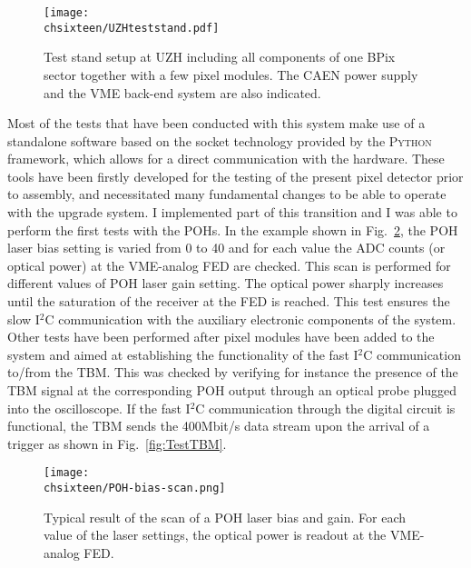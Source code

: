 \begin{figure}[!htb]
 \begin{center}
 \texttt{[image: \\chsixteen/UZHteststand.pdf]}
 \end{center}
 \caption{Test stand setup at UZH including all components of one BPix sector together with a few pixel modules. The CAEN power supply and the VME back-end system are also indicated.}
 \label{fig:TestStandUZH}
\end{figure} 

Most of the tests that have been conducted with this system make use of a standalone software based on the socket technology provided by the \textsc{Python} framework,
which allows for a direct communication with the hardware. 
These tools have been firstly developed for the testing of the present pixel detector prior to assembly\cite{Caminada:2010gsa}, and necessitated many fundamental changes to be able to operate with the upgrade system.
I implemented part of this transition and I was able to perform the first tests with the POHs.
In the example shown in Fig.~\ref{fig:TestPOH}, the POH laser bias setting is varied from 0 to 40 and for each value the ADC counts (or optical power) at the VME-analog FED are checked.
This scan is performed for different values of POH laser gain setting.
The optical power sharply increases until the saturation of the receiver at the FED is reached.
This test ensures the slow I$^2$C communication with the auxiliary electronic components of the system.
Other tests have been performed after pixel modules have been added to the system and aimed at establishing the functionality of the fast I$^2$C communication to/from the TBM.
This was checked by verifying for instance the presence of the TBM signal at the corresponding POH output through an optical probe plugged into the oscilloscope.
If the fast I$^2$C communication through the digital circuit is functional, the TBM sends the 400\unit{Mbit/s} data stream upon the arrival of a trigger as shown in Fig.~\ref{fig:TestTBM}.

\begin{figure}[!htb]
 \begin{center}
  \texttt{[image: \\chsixteen/POH-bias-scan.png]}
 \end{center}
 \caption{Typical result of the scan of a POH laser bias and gain. For each value of the laser settings, the optical power is readout at the VME-analog FED.}
 \label{fig:TestPOH}
\end{figure} 

